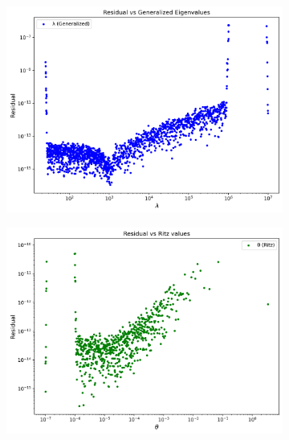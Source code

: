 \begin{figure}\label{fig:LUResidualsModShift}
	\caption{Residuals plot with moderate shift $\sigma=1.5 \times 10^3$}
	\centering
	\begin{subfigure}{.5\textwidth}
		\centering
		\includegraphics[width=.8\linewidth]{./Plots/LU/residual_lu_gs.png}
		\caption{}
		\label{fig:LUGenResModerate}
	\end{subfigure}%
	\begin{subfigure}{.5\textwidth}
		\centering
		\includegraphics[width=.8\linewidth]{./Plots/LU/residual_lu_rs.png}
		\caption{}
		\label{fig:LURitzResModerate}
	\end{subfigure}
	
	\vspace{0.5cm}
	

\end{figure}
